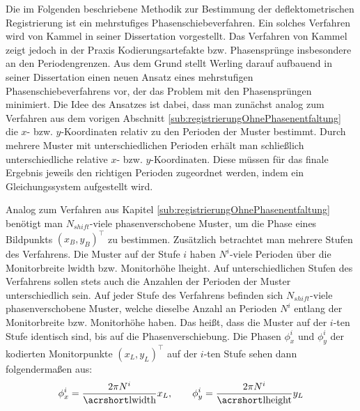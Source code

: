 Die im Folgenden beschriebene Methodik zur Bestimmung der deflektometrischen Registrierung ist ein mehrstufiges Phasenschiebeverfahren.
Ein solches Verfahren wird von Kammel in seiner Dissertation \cite{kit_kammel} vorgestellt.
Das Verfahren von Kammel zeigt jedoch in der Praxis Kodierungsartefakte bzw. Phasensprünge insbesondere an den Periodengrenzen.
Aus dem Grund stellt Werling darauf aufbauend in seiner Dissertation \cite{kit_werling} einen neuen Ansatz eines mehrstufigen Phasenschiebeverfahrens vor, der das Problem mit den Phasensprüngen minimiert.
Die Idee des Ansatzes ist dabei, dass man zunächst analog zum Verfahren aus dem vorigen Abschnitt \ref{sub:registrierungOhnePhasenentfaltung} die $x$- bzw. $y$-Koordinaten relativ zu den Perioden der Muster bestimmt.
Durch mehrere Muster mit unterschiedlichen Perioden erhält man schließlich unterschiedliche relative $x$- bzw. $y$-Koordinaten.
Diese müssen für das finale Ergebnis jeweils den richtigen Perioden zugeordnet werden, indem ein Gleichungssystem aufgestellt wird.

\p
Analog zum Verfahren aus Kapitel \ref{sub:registrierungOhnePhasenentfaltung} benötigt man $N_{shift}$-viele phasenverschobene Muster, um die Phase eines Bildpunkts $(x_B, y_B)^\top$ zu bestimmen.
Zusätzlich betrachtet man mehrere Stufen des Verfahrens.
Die Muster auf der Stufe $i$ haben $N^i$-viele Perioden über die Monitorbreite \acrshort{lwidth} bzw. Monitorhöhe \acrshort{lheight}.
Auf unterschiedlichen Stufen des Verfahrens sollen stets auch die Anzahlen der Perioden der Muster unterschiedlich sein.
Auf jeder Stufe des Verfahrens befinden sich $N_{shift}$-viele phasenverschobene Muster, welche dieselbe Anzahl an Perioden $N^i$ entlang der Monitorbreite bzw. Monitorhöhe haben.
Das heißt, dass die Muster auf der $i$-ten Stufe identisch sind, bis auf die Phasenverschiebung.
Die Phasen $\phi_x^i$ und $\phi_y^i$ der kodierten Monitorpunkte $(x_L, y_L)^\top$ auf der $i$-ten Stufe sehen dann folgendermaßen aus:
%
\begin{equation}
	\phi_x^i = \dfrac{2\pi N^i}{\acrshortmath{lwidth}} x_L,
	\qquad
	\phi_y^i = \dfrac{2\pi N^i}{\acrshortmath{lheight}} y_L
\end{equation}

